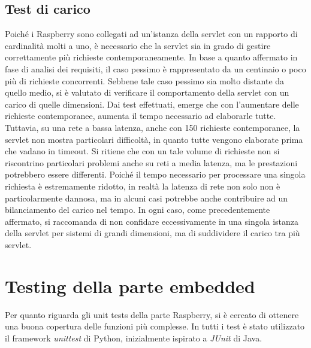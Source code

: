 \subsection{Test di carico}
Poiché i Raspberry sono collegati ad un'istanza della servlet con un rapporto di cardinalità molti a uno, è necessario che la servlet sia in grado di gestire correttamente più richieste contemporaneamente.
In base a quanto affermato in fase di analisi dei requisiti, il caso pessimo è rappresentato da un centinaio o poco più di richieste concorrenti.
Sebbene tale caso pessimo sia molto distante da quello medio, si è valutato di verificare il comportamento della servlet con un carico di quelle dimensioni.
Dai test effettuati, emerge che con l'aumentare delle richieste contemporanee, aumenta il tempo necessario ad elaborarle tutte.
Tuttavia, su una rete a bassa latenza, anche con 150 richieste contemporanee, la servlet non mostra particolari difficoltà, in quanto tutte vengono elaborate prima che vadano in timeout.
Si ritiene che con un tale volume di richieste non si riscontrino particolari problemi anche su reti a media latenza, ma le prestazioni potrebbero essere differenti.
Poiché il tempo necessario per processare una singola richiesta è estremamente ridotto, in realtà la latenza di rete non solo non è particolarmente dannosa, ma in alcuni casi potrebbe anche contribuire ad un bilanciamento del carico nel tempo.
In ogni caso, come precedentemente affermato, si raccomanda di non confidare eccessivamente in una singola istanza della servlet per sistemi di grandi dimensioni, ma di suddividere il carico tra più servlet.


\section{Testing della parte embedded}
Per quanto riguarda gli unit tests della parte Raspberry, si è cercato di ottenere una buona copertura delle funzioni più complesse.
In tutti i test è stato utilizzato il framework \textit{unittest} di Python, inizialmente ispirato a \textit{JUnit} di Java.

